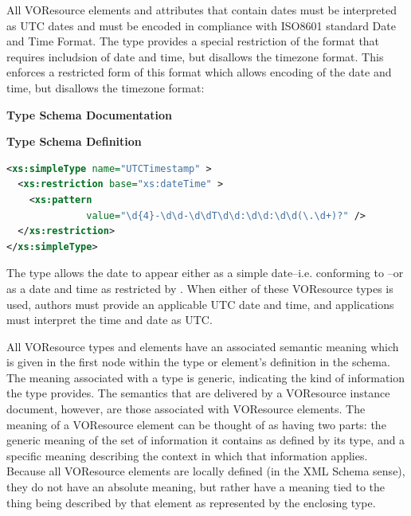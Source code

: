 \documentclass[11pt,a4paper]{ivoa}
\begin{document}
All VOResource elements and attributes that contain dates must be
interpreted as UTC dates and must be encoded in compliance with ISO8601
standard Date and Time Format.  The  type
provides a special restriction of the format that requires includsion of
date and time, but disallows the timezone format.  This enforces a
restricted form of this format which allows encoding of the date and
time, but disallows the timezone format:

\begingroup
      	\renewcommand*\descriptionlabel[1]{%
      	\hbox to 5.5em{\emph{#1}\hfil}}\vspace{2ex}\noindent\textbf{ Type Schema Documentation}


\vspace{1ex}\noindent\textbf{ Type Schema Definition}

\begin{lstlisting}[language=XML,basicstyle=\footnotesize]
<xs:simpleType name="UTCTimestamp" >
  <xs:restriction base="xs:dateTime" >
    <xs:pattern
              value="\d{4}-\d\d-\d\dT\d\d:\d\d:\d\d(\.\d+)?" />
  </xs:restriction>
</xs:simpleType>
\end{lstlisting}\endgroup


The  type allows the date to appear either
as a simple date--i.e. conforming to --or as a
date and time as restricted by .  
When either of these VOResource types is used, authors must provide an
applicable UTC date and time, and applications must interpret the time
and date as UTC. 

All VOResource types and elements have an associated semantic meaning
which is given in the first 
node within the type or element's definition in the schema.  The
meaning associated with a type is generic, indicating the kind of
information the type provides.  The semantics that are delivered by a
VOResource instance document, however, are those associated with
VOResource elements.  The meaning of a VOResource element can be
thought of as having two parts:  the generic meaning of the set of
information it contains as defined by its type, and a specific meaning
describing the context in which that information applies.  Because all
VOResource elements are locally defined (in the XML Schema
sense), they do not have an absolute meaning, but rather have a
meaning tied to the thing being described by that element as
represented by the enclosing type.  
\end{document}
